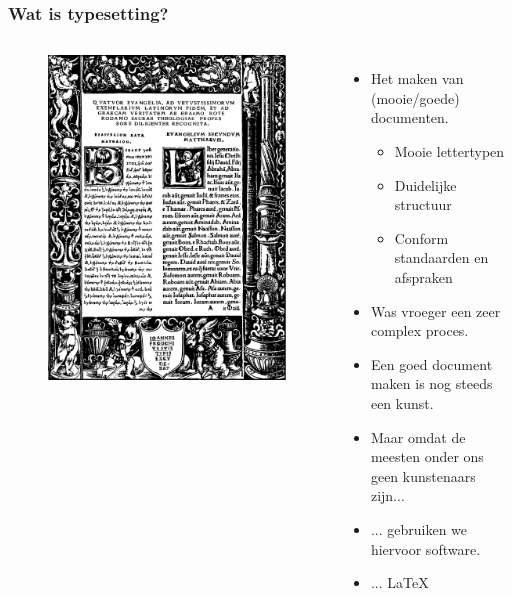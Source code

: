 \documentclass{beamer}
\begin{document}

\begin{frame}
\frametitle{Wat is typesetting?}
\begin{columns}[c] 
\begin{figure}[h] 
  \includegraphics[width=1\textwidth]{images/typesetting.png}
\end{figure}
\begin{itemize}
 \item <1-> Het maken van (mooie/goede) documenten.
 \begin{itemize}
  \item Mooie lettertypen
  \item Duidelijke structuur
  \item Conform standaarden en afspraken
 \end{itemize}
 \item <2-> Was vroeger een zeer complex proces.
 \item <3-> Een goed document maken is nog steeds een kunst.
 \item <4-> Maar omdat de meesten onder ons geen kunstenaars zijn...
 \item <4-> ... gebruiken we hiervoor software.
 \item <4-> ... \LaTeX
\end{itemize}
\end{columns}
\end{frame}
\end{document}
